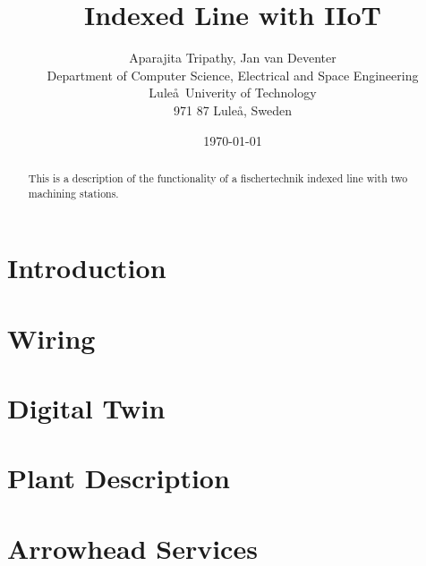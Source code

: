\documentclass[12pt]{article}
\title{Indexed Line with IIoT}
\author{Aparajita Tripathy, Jan van Deventer \\Department of Computer Science, Electrical and Space Engineering\\Lule\aa\ Univerity of Technology \\ 971 87 Lule\aa, Sweden}
\date{\today}
\begin{document}
\maketitle

\begin{abstract}
This is a description of the functionality of a fischertechnik indexed line with two machining stations.
\end{abstract}

\section{Introduction}


\section{Wiring}


\section{Digital Twin}

\section{Plant Description}

\section{Arrowhead Services}

%
%
\end{document}
